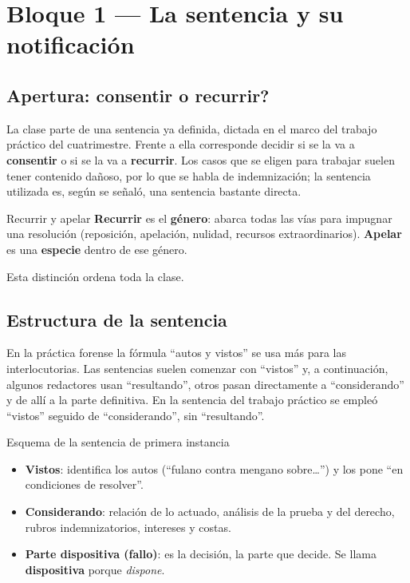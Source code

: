 \documentclass[12pt,oneside]{book}
\begin{document}
\chapter[La sentencia y su notificaci\'on]{Bloque 1 --- La sentencia y su notificaci\'on}

\section{Apertura: \textquestiondown consentir o recurrir?}

La clase parte de una sentencia ya definida, dictada en el marco del trabajo pr\'actico del cuatrimestre. Frente a ella corresponde decidir si se la va a \textbf{consentir} o si se la va a \textbf{recurrir}. Los casos que se eligen para trabajar suelen tener contenido da\~noso, por lo que se habla de indemnizaci\'on; la sentencia utilizada es, seg\'un se se\~nal\'o, una sentencia bastante directa.

\begin{definition}{Recurrir y apelar}
\textbf{Recurrir} es el \textbf{g\'enero}: abarca todas las v\'ias para impugnar una resoluci\'on (reposici\'on, apelaci\'on, nulidad, recursos extraordinarios). \textbf{Apelar} es una \textbf{especie} dentro de ese g\'enero.
\end{definition}

Esta distinci\'on ordena toda la clase.

\section{Estructura de la sentencia}

En la pr\'actica forense la f\'ormula ``autos y vistos'' se usa m\'as para las interlocutorias. Las sentencias suelen comenzar con ``vistos'' y, a continuaci\'on, algunos redactores usan ``resultando'', otros pasan directamente a ``considerando'' y de all\'i a la parte definitiva. En la sentencia del trabajo pr\'actico se empleó ``vistos'' seguido de ``considerando'', sin ``resultando''.

\begin{definition}{Esquema de la sentencia de primera instancia}
\begin{itemize}
    \item \textbf{Vistos}: identifica los autos (``fulano contra mengano sobre\ldots'') y los pone ``en condiciones de resolver''.
    \item \textbf{Considerando}: relaci\'on de lo actuado, an\'alisis de la prueba y del derecho, rubros indemnizatorios, intereses y costas.
    \item \textbf{Parte dispositiva (fallo)}: es la decisi\'on, la parte que decide. Se llama \textbf{dispositiva} porque \emph{dispone}.
\end{itemize}
\end{definition}
\end{document}
